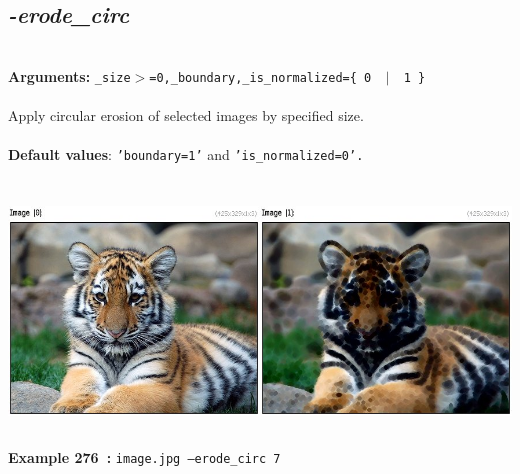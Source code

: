 \documentclass[a4paper,11pt,twoside]{book}
\begin{document}
\subsection{\emph{-erode\_circ} }\vspace*{-0.5em}
~\\\textbf{Arguments: } 
{\small \texttt{\_size$>$=0,\_boundary,\_is\_normalized=\{ 0 ~$|$~ 1 \}}}\\~\\
Apply circular erosion of selected images by specified size.
~\\~\\\textbf{Default values}: {\small \texttt{'boundary=1'} and \texttt{'is\_normalized=0'.}}
\begin{center}\includegraphics[keepaspectratio=true,height=7cm,width=\textwidth]{img/gmic_def276.jpg}\\
{\footnotesize \textbf{Example 276~:} \texttt{image.jpg --erode\_circ 7}}
\end{center}
\end{document}
